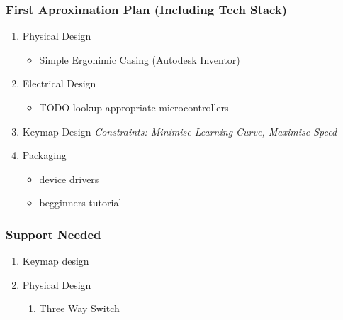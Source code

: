 \documentclass[11pt]{article}
\begin{document}
\subsubsection{First Aproximation Plan (Including Tech Stack)}
\label{sec:org5256635}
\begin{enumerate}
\item Physical Design
\label{sec:orgb294e2f}
\begin{itemize}
\item Simple Ergonimic Casing (Autodesk Inventor)
\end{itemize}
\item Electrical Design
\label{sec:org2d45bec}
\begin{itemize}
\item TODO lookup appropriate microcontrollers
\end{itemize}

\item Keymap Design
\label{sec:orgbef1a72}
\emph{Constraints: Minimise Learning Curve, Maximise Speed}
\item Packaging
\label{sec:orgb892b2e}
\begin{itemize}
\item device drivers
\item begginners tutorial
\end{itemize}
\end{enumerate}
\subsubsection{Support Needed}
\label{sec:orgbef738c}

\begin{enumerate}
\item Keymap design
\label{sec:orgdc39aab}
\item Physical Design
\label{sec:org78c5e13}
\begin{enumerate}
\item Three Way Switch
\label{sec:org57ab83c}
\end{enumerate}
\end{enumerate}
\end{document}
